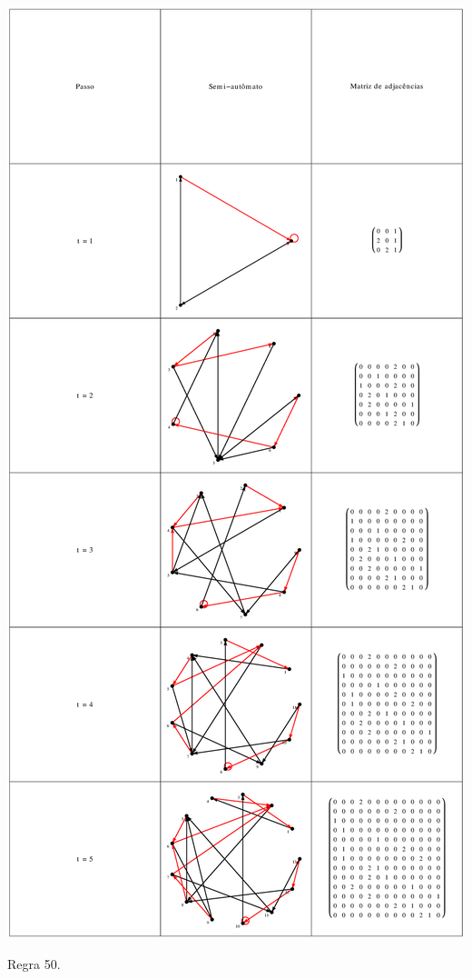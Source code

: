 \documentclass[12pt,a4paper]{article}
\begin{document}
\begin{table}[H]
\begin{center}
\includegraphics[scale=0.32]{img/mat/matr50.eps}
\caption{Regra 50.}
\label{tab:mr50}
\end{center}
\end{table}
\end{document}
